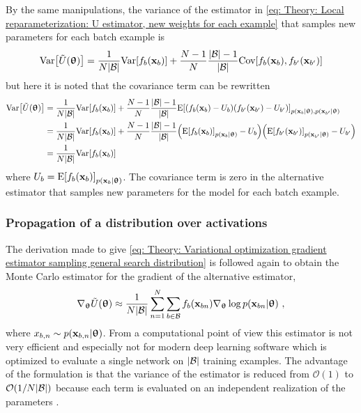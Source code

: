 By the same manipulations, the variance of the estimator in \eqref{eq: Theory: Local reparameterization: U estimator, new weights for each example} that samples new parameters for each batch example is
\begin{equation*}
    \text{Var}{\left[\tilde{U}({\boldsymbol{\uptheta}})\right]}
    = \frac{1}{N{\left\lvert\mathcal{B}\right\rvert}}\text{Var}{\left[f_b({\mathbf{x}}_{b})\right]} + \frac{N-1}{N}\frac{{\left\lvert\mathcal{B}\right\rvert}-1}{{\left\lvert\mathcal{B}\right\rvert}} \text{Cov}{\left[f_b({\mathbf{x}}_{b}),f_{b'}({\mathbf{x}}_{b'})\right]}
\end{equation*}
but here it is noted that the covariance term can be rewritten
\begin{align}
    \text{Var}{\left[\tilde{U}({\boldsymbol{\uptheta}})\right]}
    &= \frac{1}{N{\left\lvert\mathcal{B}\right\rvert}}\text{Var}{\left[f_b({\mathbf{x}}_{b})\right]} + \frac{N-1}{N}\frac{{\left\lvert\mathcal{B}\right\rvert}-1}{{\left\lvert\mathcal{B}\right\rvert}}\text{E}{\left[{\left(f_b({\mathbf{x}}_{b})-U_b\right)}{\left(f_{b'}({\mathbf{x}}_{b'})-U_{b'}\right)}\right]}_{p({\mathbf{x}}_b|{\boldsymbol{\uptheta}}),p({\mathbf{x}}_{b'}|{\boldsymbol{\uptheta}})}\nonumber\\
    &= \frac{1}{N{\left\lvert\mathcal{B}\right\rvert}}\text{Var}{\left[f_b({\mathbf{x}}_{b})\right]} + \frac{N-1}{N}\frac{{\left\lvert\mathcal{B}\right\rvert}-1}{{\left\lvert\mathcal{B}\right\rvert}}{\left(\text{E}{\left[f_b({\mathbf{x}}_{b})\right]}_{p({\mathbf{x}}_b|{\boldsymbol{\uptheta}})}-U_b\right)}{\left(\text{E}{\left[f_{b'}({\mathbf{x}}_{b'})\right]}_{p({\mathbf{x}}_{b'}|{\boldsymbol{\uptheta}})}-U_{b'}\right)}\nonumber\\
    &= \frac{1}{N{\left\lvert\mathcal{B}\right\rvert}}\text{Var}{\left[f_b({\mathbf{x}}_{b})\right]}
\end{align}
where $U_b = \text{E}{\left[f_{b}({\mathbf{x}}_{b})\right]}_{p({\mathbf{x}}_b|{\boldsymbol{\uptheta}})}$. The covariance term is zero in the alternative estimator that samples new parameters for the model for each batch example.


\subsubsection{Propagation of a distribution over activations}
The derivation made to give \eqref{eq: Theory: Variational optimization gradient estimator sampling general search distribution} is followed again to obtain the Monte Carlo estimator for the gradient of the alternative estimator, 
\begin{equation}
    \nabla_{\boldsymbol{\uptheta}} \tilde{U}({\boldsymbol{\uptheta}}) \approx \frac{1}{N{\left\lvert\mathcal{B}\right\rvert}}\sum_{n=1}^N\sum_{b\in\mathcal{B}}f_b({\mathbf{x}}_{bn})\nabla_{\boldsymbol{\uptheta}}\log p({\mathbf{x}}_{bn}|{\boldsymbol{\uptheta}}) \ ,
\end{equation}
where $x_{b,n}\sim p({\mathbf{x}}_{b,n}|{\boldsymbol{\uptheta}})$. From a computational point of view this estimator is not very efficient and especially not for modern deep learning software which is optimized to evaluate a single network on ${\left\lvert\mathcal{B}\right\rvert}$ training examples. The advantage of the formulation is that the variance of the estimator is reduced from $\mathcal{O}(1)$ to $\mathcal{O}(1/N{\left\lvert\mathcal{B}\right\rvert})$ because each term is evaluated on an independent realization of the parameters \cite{Kingma2015a}. 


